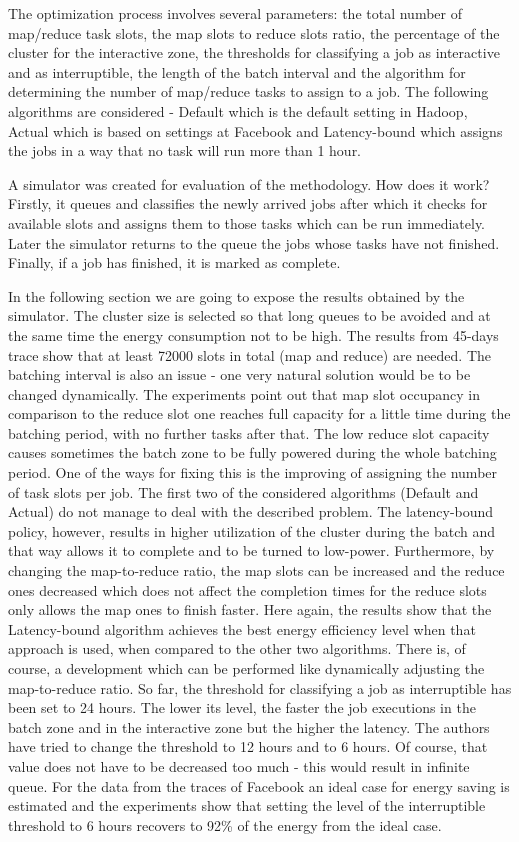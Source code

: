 \documentclass[9pt, a4paper]{article}
\theoremstyle{plain}
\begin{document}
The optimization process involves several parameters: the total number of map/reduce
task slots, the map slots to reduce slots ratio, the percentage of the cluster for the
interactive zone, the thresholds for classifying a job as interactive and as interruptible,
the length of the batch interval and the algorithm for determining the number of
map/reduce tasks to assign to a job. The following algorithms are considered - Default which
is the default setting in Hadoop, Actual which is based on settings at Facebook
and Latency-bound which assigns the jobs in a way that no task will run more than 1 hour.

A simulator was created for evaluation of the methodology. How does it work? Firstly,
it queues and classifies the newly arrived jobs after which it checks for available slots
and assigns them to those tasks which can be run immediately. Later the simulator
returns to the queue the jobs whose tasks have not finished. Finally, if a job has finished,
it is marked as complete.

In the following section we are going to expose the results obtained by the simulator.
The cluster size is selected so that long queues to be avoided and at the
same time the energy consumption not to be high. The results from 45-days trace
show that at least 72000 slots in total (map and reduce) are needed. The batching interval is also an
issue - one very natural solution would be to be changed dynamically. The
experiments point out that map slot occupancy in comparison to the reduce slot one
reaches full capacity for a little time during the batching period, with no further
tasks after that. The low reduce slot capacity causes sometimes the batch zone to be fully powered
during the whole batching period. One of the ways for fixing this is the improving of assigning
the number of task slots per job. The first two of the considered algorithms (Default and Actual)
do not manage to deal with the described problem. The latency-bound policy,
however, results in higher utilization of the cluster during the batch and that
way allows it to complete and to be turned to low-power. Furthermore, by changing the map-to-reduce
ratio, the map slots can be increased and the reduce ones decreased which does not
affect the completion times for the reduce slots only allows the map ones to finish
faster. Here again, the results show that the Latency-bound algorithm achieves
the best energy efficiency level when that approach is used, when compared to the other two algorithms. There is, of course,
a development which can be performed like dynamically adjusting the map-to-reduce
ratio. So far, the threshold for classifying a job as interruptible has been set to
24 hours. The lower its level, the faster the job executions in the batch zone and in the interactive
zone but the higher the latency. The authors have tried to change the threshold to
12 hours and to 6 hours. Of course, that value does not have to be decreased too much -
this would result in infinite queue. For the data from the traces of Facebook an ideal case
for energy saving is estimated and the experiments show that setting the level of the
interruptible threshold to 6 hours recovers to 92\% of the energy from the ideal case.
\end{document}
